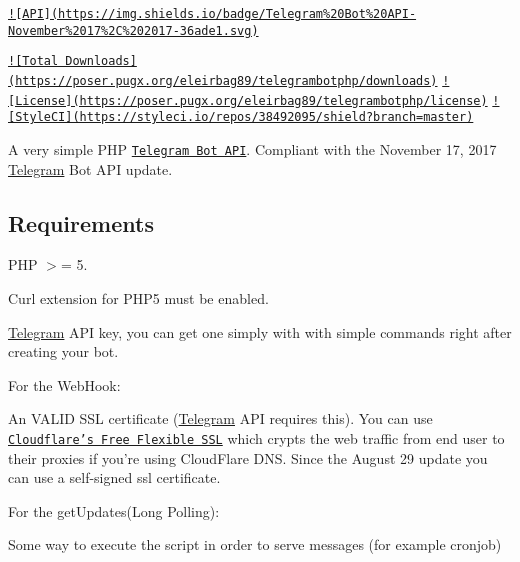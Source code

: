 \href{https://core.telegram.org/bots/api}{\tt !\mbox{[}A\-P\-I\mbox{]}(https\-://img.\-shields.\-io/badge/\-Telegram\%20\-Bot\%20\-A\-P\-I-\/\-November\%2017\%2\-C\%202017-\/36ade1.\-svg)}  

\href{https://packagist.org/packages/eleirbag89/telegrambotphp}{\tt !\mbox{[}Total Downloads\mbox{]}(https\-://poser.\-pugx.\-org/eleirbag89/telegrambotphp/downloads)} \href{https://packagist.org/packages/eleirbag89/telegrambotphp}{\tt !\mbox{[}License\mbox{]}(https\-://poser.\-pugx.\-org/eleirbag89/telegrambotphp/license)} \href{https://styleci.io/repos/38492095}{\tt !\mbox{[}Style\-C\-I\mbox{]}(https\-://styleci.\-io/repos/38492095/shield?branch=master)}

A very simple P\-H\-P \href{https://core.telegram.org/bots}{\tt Telegram Bot A\-P\-I}. Compliant with the November 17, 2017 \hyperlink{class_telegram}{Telegram} Bot A\-P\-I update.

\subsection*{Requirements }


\begin{DoxyItemize}
\item P\-H\-P $>$= 5.
\item Curl extension for P\-H\-P5 must be enabled.
\item \hyperlink{class_telegram}{Telegram} A\-P\-I key, you can get one simply with \href{https://core.telegram.org/bots#botfather}{\tt } with simple commands right after creating your bot.
\end{DoxyItemize}

For the Web\-Hook\-:
\begin{DoxyItemize}
\item An V\-A\-L\-I\-D S\-S\-L certificate (\hyperlink{class_telegram}{Telegram} A\-P\-I requires this). You can use \href{https://www.cloudflare.com/ssl}{\tt Cloudflare's Free Flexible S\-S\-L} which crypts the web traffic from end user to their proxies if you're using Cloud\-Flare D\-N\-S. Since the August 29 update you can use a self-\/signed ssl certificate.
\end{DoxyItemize}

For the get\-Updates(\-Long Polling)\-:
\begin{DoxyItemize}
\item Some way to execute the script in order to serve messages (for example cronjob)
\end{DoxyItemize}

